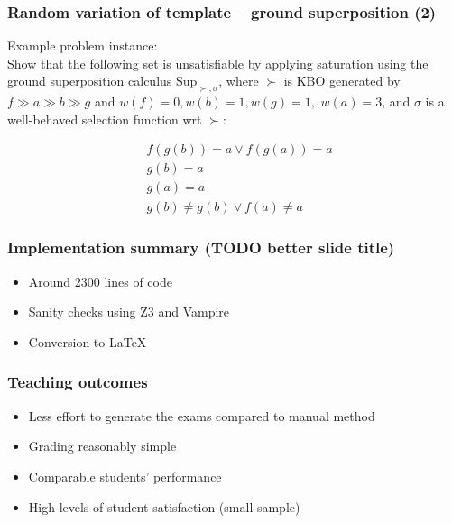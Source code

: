 \documentclass[xcolor={table}]{beamer}
\begin{document}


\begin{frame}
  \frametitle{Random variation of template -- ground superposition (2)}


Example problem instance:\\
  \vspace*{1em}
Show that the following set is unsatisfiable by applying saturation using the
ground superposition calculus $\textrm{Sup}_{\succ,\sigma}$, where
$\succ$ is KBO generated by 
$f \gg a \gg b \gg g$
and
$w(f) = 0, w(b) = 1, w(g) = 1,$ $w(a) = 3$,
and $\sigma$ is a well-behaved selection function wrt $\succ$:

\begin{align*}
& f(g(b)) = a \lor f(g(a)) = a
~\\~
& g(b) = a
~\\~
& g(a) = a
~\\~
& g(b)  \neq  g(b) \lor f(a)  \neq  a
\end{align*}


\end{frame}



\begin{frame}
\frametitle{Implementation summary (TODO better slide title)}
\begin{itemize}
\item Around 2300 lines of code
\item Sanity checks using Z3 and Vampire
\item Conversion to \LaTeX
\end{itemize}
\end{frame}



\begin{frame}
\frametitle{Teaching outcomes}
\begin{itemize}
\item Less effort to generate the exams compared to manual method
\item Grading reasonably simple
\item Comparable students' performance
\item High levels of student satisfaction (small sample)
\end{itemize}
\end{frame}
\end{document}
